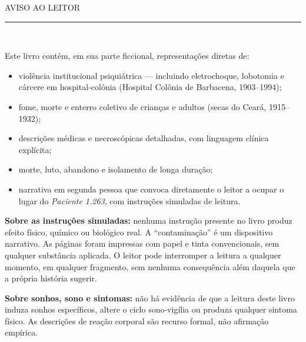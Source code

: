 \cleardoublepage
\thispagestyle{empty}
\begingroup
\setlength{\fboxsep}{8mm}
\begin{center}
{\color{sangue}\scshape\Large AVISO AO LEITOR}\\[1.2em]
{\color{sangue}\rule{0.4\paperwidth}{0.6pt}}\\[2.2em]
\end{center}

\noindent Este livro contém, em sua parte ficcional, representações diretas de:

\begin{itemize}
\itemsep0.4em
\item violência institucional psiquiátrica --- incluindo eletrochoque, lobotomia e cárcere em hospital-colônia (Hospital Colônia de Barbacena, 1903--1994);
\item fome, morte e enterro coletivo de crianças e adultos (secas do Ceará, 1915--1932);
\item descrições médicas e necroscópicas detalhadas, com linguagem clínica explícita;
\item morte, luto, abandono e isolamento de longa duração;
\item narrativa em segunda pessoa que convoca diretamente o leitor a ocupar o lugar do \textit{Paciente 1.263}, com instruções simuladas de leitura.
\end{itemize}

\vspace{1em}

\noindent \textbf{Sobre as instruções simuladas:} nenhuma instrução presente no livro produz efeito físico, químico ou biológico real. A ``contaminação'' é um dispositivo narrativo. As páginas foram impressas com papel e tinta convencionais, sem qualquer substância aplicada. O leitor pode interromper a leitura a qualquer momento, em qualquer fragmento, sem nenhuma consequência além daquela que a própria história sugerir.

\vspace{1em}

\noindent \textbf{Sobre sonhos, sono e sintomas:} não há evidência de que a leitura deste livro induza sonhos específicos, altere o ciclo sono-vigília ou produza qualquer sintoma físico. As descrições de reação corporal são recurso formal, não afirmação empírica.

\vspace{1em}

